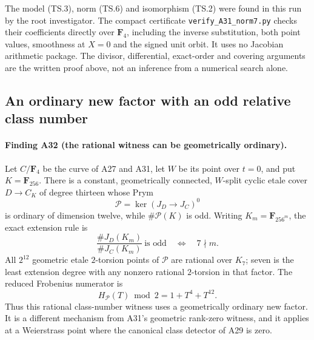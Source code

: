 \documentclass[11pt,a4paper]{article}
\begin{document}
The model (TS.3), norm (TS.6) and isomorphism (TS.2) were found
in this run by the root investigator.  The compact certificate
\texttt{verify\_A31\_norm7.py} checks their coefficients directly
over $\mathbf F_4$, including the inverse substitution, both point
values, smoothness at $X=0$ and the signed unit orbit.  It uses no
Jacobian arithmetic package.  The divisor, differential, exact-order
and covering arguments are the written proof above, not an
inference from a numerical search alone.


\subsection{An ordinary new factor with an odd relative class number}
\label{sec:ordinary-rational-witness}

\paragraph{Finding A32 (the rational witness can be geometrically ordinary).}
Let $C/\mathbf F_4$ be the curve of A27 and A31, let $W$ be its
point over $t=0$, and put $K=\mathbf F_{256}$.  There is a constant,
geometrically connected, $W$-split cyclic etale cover $D\to C_K$
of degree thirteen whose Prym
\[
             \mathcal P=\ker(J_D\longrightarrow J_C)^0
 \tag{OR.1}
\]
is ordinary of dimension twelve, while $\#\mathcal P(K)$ is odd.
Writing $K_m=\mathbf F_{256^m}$, the exact extension rule is
\[
 \frac{\#J_D(K_m)}{\#J_C(K_m)}\ \text{is odd}
             \quad\Longleftrightarrow\quad 7\nmid m.
 \tag{OR.2}
\]
All $2^{12}$ geometric etale $2$-torsion points of $\mathcal P$
are rational over $K_7$; seven is the least extension degree
with any nonzero rational $2$-torsion in that factor.
The reduced Frobenius numerator is
\[
                H_{\mathcal P}(T)\bmod2=1+T^4+T^{12}.
 \tag{OR.3}
\]
Thus this rational class-number witness uses a geometrically
ordinary new factor.  It is a different mechanism from A31's
geometric rank-zero witness, and it applies at a Weierstrass
point where the canonical class detector of A29 is zero.
\end{document}

